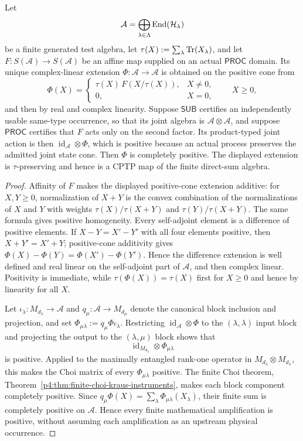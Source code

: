 \documentclass[12pt,a4paper]{article}
\begin{document}
\begin{theorem}
\label{p4:thm:cp-forced}
Let
\[
\mathcal A=\bigoplus_{\lambda\in\Lambda}
\operatorname{End}(\mathcal H_\lambda)
\]
be a finite generated test algebra, let
\(\tau(X):=\sum_\lambda\operatorname{Tr}(X_\lambda)\), and let
\(F:S(\mathcal A)\to S(\mathcal A)\) be an affine map supplied on an actual
\(\mathsf{PROC}\) domain.  Its unique complex-linear extension
\(\Phi:\mathcal A\to\mathcal A\) is obtained on the positive cone from
\[
\Phi(X)=
\begin{cases}
\tau(X)\,F\!\left(X/\tau(X)\right),&X\ne0,\\
0,&X=0,
\end{cases}
\qquad X\ge0,
\]
and then by real and complex linearity.  Suppose \(\mathsf{SUB}\) certifies
an independently usable same-type occurrence, so that its joint algebra is
\(\mathcal A\otimes\mathcal A\), and suppose \(\mathsf{PROC}\) certifies
that \(F\) acts only on the second factor.  Its product-typed joint action is
then \(\operatorname{id}_{\mathcal A}\otimes\Phi\), which is positive
because an actual process preserves the admitted joint state cone.  Then
\(\Phi\) is completely positive.  The displayed extension is
\(\tau\)-preserving and hence is a CPTP map of the finite direct-sum algebra.
\end{theorem}


\begin{proof}
Affinity of \(F\) makes the displayed positive-cone extension additive:
for \(X,Y\ge0\), normalization of \(X+Y\) is the convex combination of the
normalizations of \(X\) and \(Y\) with weights
\(\tau(X)/\tau(X+Y)\) and \(\tau(Y)/\tau(X+Y)\).  The same formula gives positive
homogeneity.  Every self-adjoint element is a difference of positive
elements.  If \(X-Y=X'-Y'\) with all four elements positive, then
\(X+Y'=X'+Y\); positive-cone additivity gives
\(\Phi(X)-\Phi(Y)=\Phi(X')-\Phi(Y')\).  Hence the difference extension is
well defined and real linear on the self-adjoint part of \(\mathcal A\), and
then complex linear.  Positivity is immediate, while
\(\tau(\Phi(X))=\tau(X)\) first for \(X\ge0\) and hence by linearity for all
\(X\).

Let \(\iota_\lambda:M_{d_\lambda}\to\mathcal A\) and
\(q_\mu:\mathcal A\to M_{d_\mu}\) denote the canonical block inclusion and
projection, and set
\(\Phi_{\mu\lambda}:=q_\mu\Phi\iota_\lambda\).  Restricting
\(\operatorname{id}_{\mathcal A}\otimes\Phi\) to the
\((\lambda,\lambda)\) input block and projecting the output to the
\((\lambda,\mu)\) block shows that
\[
\operatorname{id}_{M_{d_\lambda}}\otimes\Phi_{\mu\lambda}
\]
is positive.  Applied to the maximally entangled rank-one operator in
\(M_{d_\lambda}\otimes M_{d_\lambda}\), this makes the Choi matrix of every
\(\Phi_{\mu\lambda}\) positive.  The finite Choi theorem,
Theorem~\ref{p4:thm:finite-choi-kraus-instruments}, makes each block component
completely positive.  Since
\(q_\mu\Phi(X)=\sum_\lambda\Phi_{\mu\lambda}(X_\lambda)\), their finite sum
is completely positive on \(\mathcal A\).  Hence every finite mathematical
amplification is positive, without assuming each amplification as an
upstream physical occurrence.
\end{proof}
\end{document}
